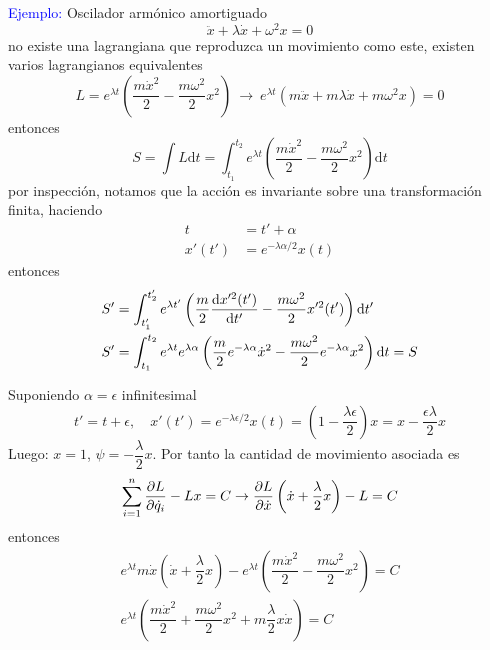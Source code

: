 \documentclass[../main]{subfiles}
\begin{document}
\textcolor{blue}{Ejemplo:} Oscilador armónico amortiguado 
\begin{equation}
    \ddot{x}+\lambda\dot{x}+\omega^2 x=0
\end{equation}
no existe una lagrangiana que reproduzca un movimiento como este, existen varios lagrangianos equivalentes 
\begin{equation}
    L=e^{\lambda t}\left(\dfrac{m\dot{x}^2}{2}-\dfrac{m\omega^2}{2}x^2\right) \ \rightarrow \ e^{\lambda t}(m\ddot{x}+m\lambda\dot{x}+m\omega^2 x)=0
\end{equation}
entonces 
\begin{equation}
    S=\int L \mathrm{d}t=\int_{t_1}^{t_2} e^{\lambda t}\left(\dfrac{m\dot{x}^2}{2}-\dfrac{m\omega^2}{2}x^2\right)\mathrm{d}t
\end{equation}
por inspección, notamos que la acción es invariante sobre una transformación finita, haciendo 
\begin{equation}
    \begin{split}
        t&=t'+\alpha\\
        x'(t')&=e^{-\lambda \alpha/2}x(t)
    \end{split}
\end{equation}
entonces 
\begin{equation}
    \begin{split}
        S'&=\int_{t'_1}^{t'_2} e^{\lambda t'}\left(\dfrac{m}{2}\dv{x'^2(t')}{t'}-\dfrac{m\omega^2}{2}x'^2(t')\right)\mathrm{d}t'\\
        S'&=\int_{t_1}^{t_2} e^{\lambda t}e^{\lambda \alpha} \left(\dfrac{m}{2}e^{-\lambda \alpha}\dot{x}^2-\dfrac{m\omega^2}{2}e^{-\lambda\alpha}x^2\right)\mathrm{d}t=S
    \end{split}
\end{equation}

Suponiendo $\alpha=\epsilon$ infinitesimal 
\begin{equation}
    t'=t+\epsilon,\quad x'(t')=e^{-\lambda\epsilon/2}x(t)=\left(1-\dfrac{\lambda\epsilon}{2}\right)x=x-\dfrac{\epsilon\lambda}{2}x
\end{equation}
Luego: $x=1$, $\psi=-\dfrac{\lambda}{2}x$. Por tanto la cantidad de movimiento asociada es 
\begin{equation}
    \sum_{i=1}^n \pdv{L}{\dot{q}_i}(\dot{q}_i x-\psi_i)-Lx=C \rightarrow \pdv{L}{\dot{x}}\left(\dot{x}+\dfrac{\lambda}{2}x\right)-L=C
\end{equation}
entonces 
\begin{equation}
    \begin{split}
        e^{\lambda t}m\dot{x}\left(\dot{x}+\dfrac{\lambda}{2}x\right)-e^{\lambda t}\left(\dfrac{m\dot{x}^2}{2}-\dfrac{m\omega^2}{2}x^2\right)=C\\
        e^{\lambda t}\left(\dfrac{m\dot{x}^2}{2}+\dfrac{m\omega^2}{2}x^2+m\dfrac{\lambda}{2}x\dot{x}\right)=C
    \end{split}
\end{equation}
\end{document}
